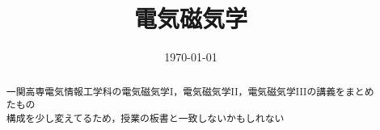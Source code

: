 

\title{電気磁気学}
\date{\today}



\maketitle
\pagestyle{fancy}

\begin{abstract}
一関高専電気情報工学科の電気磁気学I，電気磁気学II，電気磁気学IIIの講義をまとめたもの\\
構成を少し変えてるため，授業の板書と一致しないかもしれない
\end{abstract}

% 


\newpage


